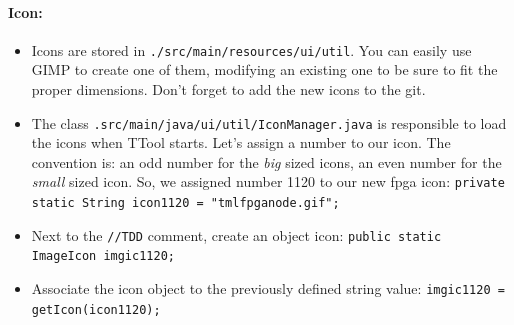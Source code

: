 \documentclass[12pt]{article}
\begin{document}
\paragraph{Icon:} 
\begin{itemize}
\item Icons are stored in \texttt{./src/main/resources/ui/util}. You can easily use GIMP to create one of them, modifying an existing one to be sure to fit the proper dimensions. Don't forget to add the new icons to the git.

\item The class \texttt{.src/main/java/ui/util/IconManager.java} is responsible to load the icons when TTool starts. Let's assign a number to our icon. The convention is: an odd number for the \textit{big} sized icons, an even number for the \textit{small} sized icon. So, we assigned number 1120 to our new fpga icon: \texttt{private static String icon1120 = "tmlfpganode.gif";}

\item Next to the \texttt{//TDD} comment, create an object icon: \texttt{public static ImageIcon imgic1120;}

\item Associate the icon object to the previously defined string value: \texttt{imgic1120 = getIcon(icon1120);} 
\end{itemize}
\end{document}
